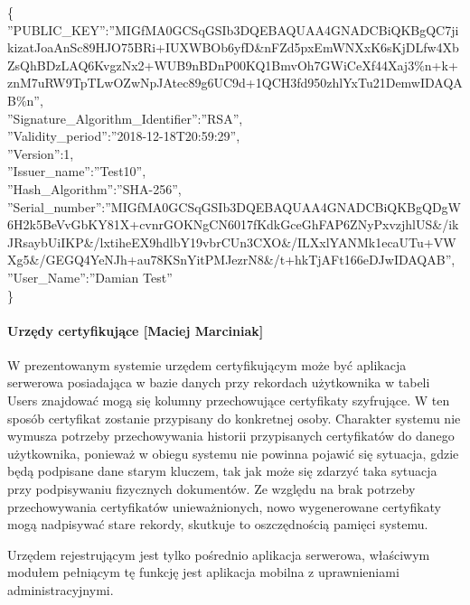 {\footnotesize  \{\\
	''PUBLIC\_KEY'':''MIGfMA0GCSqGSIb3DQEBAQUAA4GNADCBiQKBgQC7jik\linebreak izatJoaAnSc89HJO75BRi+IUXWBOb6yfD\&nFZd5pxEmWNXxK6sKjDLfw4XbZ\linebreak sQhBDzLAQ6KvgzNx2+WUB9nBDnP00KQ1BmvOh7GWiCeXf44Xaj3\%n+k+znM7\linebreak uRW9TpTLwOZwNpJAtec89g6UC9d+1QCH3fd950zhlYxTu21DemwIDAQAB\%n'',\\
	''Signature\_Algorithm\_Identifier'':''RSA'',\\
	''Validity\_period'':''2018-12-18T20:59:29'',\\
	''Version'':1,\\
	''Issuer\_name'':''Test10'',\\
	''Hash\_Algorithm'':''SHA-256'',\\
	''Serial\_number'':''MIGfMA0GCSqGSIb3DQEBAQUAA4GNADCBiQKBgQD\linebreak gW6H2k5BeVvGbKY81X+cvnrGOKNgCN6017fKdkGceGhFAP6ZNyPxvzjhlUS\&\linebreak /ikJRsaybUiIKP\&/lxtiheEX9hdlbY19vbrCUn3CXO\&/ILXxlYANMk1eca\linebreak UTu+VWXg5\&/GEGQ4YeNJh+au78KSnYitPMJezrN8\&/t+hkTjAFt166eDJw\linebreak IDAQAB'',\\
	''User\_Name'':''Damian Test''  \\
	\}}

\paragraph*{Urzędy certyfikujące [Maciej Marciniak]}
W prezentowanym systemie urzędem certyfikującym może być aplikacja serwerowa posiadająca w bazie danych przy rekordach użytkownika w tabeli Users znajdować mogą się kolumny przechowujące certyfikaty szyfrujące. W ten sposób certyfikat zostanie przypisany do konkretnej osoby. Charakter systemu nie wymusza potrzeby przechowywania historii przypisanych certyfikatów do danego użytkownika, ponieważ w obiegu systemu nie powinna pojawić się sytuacja, gdzie będą podpisane dane starym kluczem, tak jak może się zdarzyć taka sytuacja przy podpisywaniu fizycznych dokumentów. Ze względu na brak potrzeby przechowywania certyfikatów unieważnionych, nowo wygenerowane certyfikaty mogą nadpisywać stare rekordy, skutkuje to oszczędnością pamięci systemu. 

Urzędem rejestrującym jest tylko pośrednio aplikacja serwerowa, właściwym modułem pełniącym tę funkcję jest aplikacja mobilna z uprawnieniami administracyjnymi.

